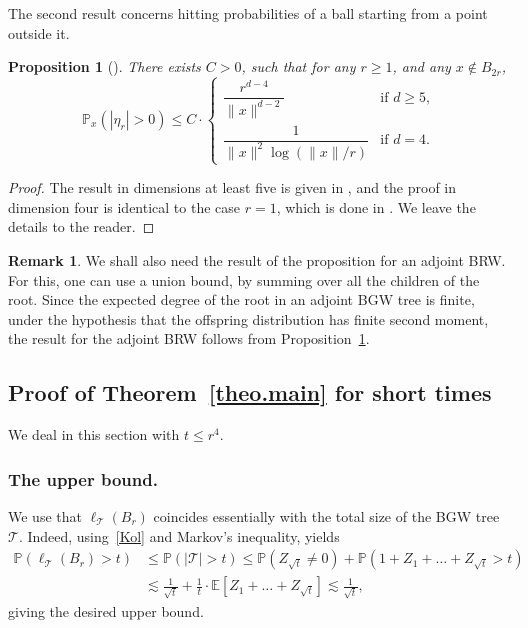 \documentclass[JEP,XML,SOM,Unicode,NoFloatCountersInSection,published]{cedram}
\theoremstyle{plain}
\newtheorem{proposition}[theorem]{Proposition}
\theoremstyle{definition}
\newtheorem{remark}[theorem]{Remark}
\newcommand\T{\mathcal{T}}
\newcommand{\1}{{\text{\Large $\mathfrak 1$}}}
\begin{document}
The second result concerns hitting probabilities of a ball starting from a point outside it.

\begin{proposition}[\cite{Zhu1,Zhu4}] \label{prop.hit.upper}
There exists $C>0$, such that for any $r\ge 1$, and any $x\notin B_{2r}$,
\begin{equation*}
\mathbb P_x(|\eta_r|>0) \le C\cdot
\begin{cases}
\dfrac{r^{d-4}}{\|x\|^{d-2}} & \text{if }d\ge 5, \\
\dfrac 1{\|x\|^2\log (\|x\|/r) }& \text{if }d=4.
\end{cases}
\end{equation*}
\end{proposition}
\begin{proof}
The result in dimensions at least five is given in \cite{Zhu1}, and the proof in dimension four is identical to the case $r=1$, which is done in \cite{Zhu4}.
We leave the details to the reader.
\end{proof}

\begin{remark}\label{rem.hit.adjoint}
We shall also need the result of the proposition for an adjoint BRW. For this, one can use a union bound, by summing over all the children of the root. Since the expected degree of the root in an adjoint BGW tree is finite, under the hypothesis that the offspring distribution has finite second moment, the result for the adjoint BRW follows from Proposition~\ref{prop.hit.upper}.
\end{remark}

\subsection{Proof of Theorem~\ref{theo.main} for short times}

We deal in this section with $t\le r^4$.

\subsubsection*{The upper bound.}
We use that $\ell_\T(B_r)$ coincides
essentially with the total size of the BGW tree $\T$.
Indeed, using~\eqref{Kol} and Markov's inequality, yields
\begin{align*}
\mathbb P(\ell_\T(B_r) > t) &
\le \mathbb P(|\mathbf{\mathcal T}|>t) \le \mathbb P(Z_{\sqrt t}\neq 0) + \mathbb P(1+Z_1+\dots + Z_{\sqrt t} > t) \\
&\lesssim \frac 1{\sqrt t} + \frac 1t \cdot \mathbb E[Z_1+\dots+ Z_{\sqrt t}] \lesssim \frac 1{\sqrt t},
\end{align*}
giving the desired upper bound.
\end{document}
